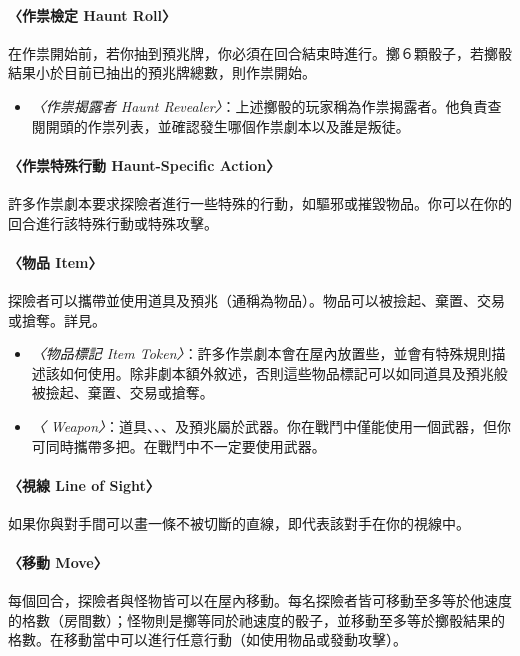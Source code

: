 \paragraph{〈作祟檢定 Haunt Roll〉}
在作祟開始前，若你抽到預兆牌，你必須在回合結束時進行。擲６顆骰子，若擲骰結果小於目前已抽出的預兆牌總數，則作祟開始。

\begin{itemize}
  \item \textit{〈作祟揭露者 Haunt Revealer〉}：上述擲骰的玩家稱為作祟揭露者。他負責查閱開頭的作祟列表，並確認發生哪個作祟劇本以及誰是叛徒。
\end{itemize}

\paragraph{〈作祟特殊行動 Haunt-Specific Action〉}
許多作祟劇本要求探險者進行一些特殊的行動，如驅邪或摧毀物品。你可以在你的回合進行該特殊行動或特殊攻擊。

\paragraph{〈物品 Item〉} \label{glossary:item}
探險者可以攜帶並使用道具及預兆（通稱為物品）。物品可以被撿起、棄置、交易或搶奪。詳見。

\begin{itemize}
  \item \textit{〈物品標記 Item Token〉}：許多作祟劇本會在屋內放置些，並會有特殊規則描述該如何使用。除非劇本額外敘述，否則這些物品標記可以如同道具及預兆般被撿起、棄置、交易或搶奪。
  \item \textit{〈 Weapon〉}：道具、、、及預兆屬於武器。你在戰鬥中僅能使用一個武器，但你可同時攜帶多把。在戰鬥中不一定要使用武器。
\end{itemize}

\paragraph{〈視線 Line of Sight〉} \label{glossary:line-of-sight}
如果你與對手間可以畫一條不被切斷的直線，即代表該對手在你的視線中。

\paragraph{〈移動 Move〉}
每個回合，探險者與怪物皆可以在屋內移動。每名探險者皆可移動至多等於他速度的格數（房間數）；怪物則是擲等同於祂速度的骰子，並移動至多等於擲骰結果的格數。在移動當中可以進行任意行動（如使用物品或發動攻擊）。

